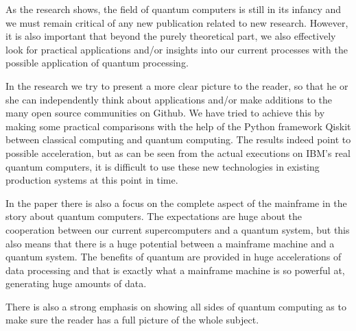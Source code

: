 As the research shows, the field of quantum computers is still in its infancy and we must remain critical of any new publication related to new research. However, it is also important that beyond the purely theoretical part, we also effectively look for practical applications and/or insights into our current processes with the possible application of quantum processing. 

In the research we try to present a more clear picture to the reader, so that he or she can independently think about applications and/or make additions to the many open source communities on Github. We have tried to achieve this by making some practical comparisons with the help of the Python framework Qiskit between classical computing and quantum computing. The results indeed point to  possible acceleration, but as can be seen from the actual executions on IBM's real quantum computers, it is difficult to use these new technologies in existing production systems at this point in time. 

In the paper there is also a focus on the complete aspect of the mainframe in the story about quantum computers. The expectations are huge about the cooperation between our current supercomputers and a quantum system, but this also means that there is a huge potential between a mainframe machine and a quantum system. The benefits of quantum are provided in huge accelerations of data processing and that is exactly what a mainframe machine is so powerful at, generating huge amounts of data.

There is also a strong emphasis on showing all sides of quantum computing as to make sure the reader has a full picture of the whole subject.

